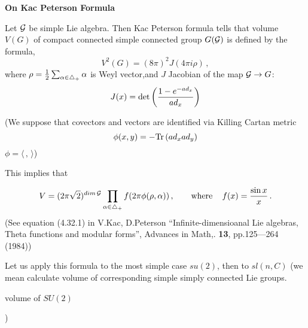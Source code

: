 \baselineskip-14pt

\def\e{{\bf e}}
\def\f{{\bf f}}
\def\y{{\bf y}}
\def\p{\partial}
\def\a{\alpha}
\def\t{\tilde}
\def\G {{\cal G}}
\def\C {{\bf C}}
\def\vare{\varepsilon}
\def\t {{\bf t}}
\def\Tr {{\rm Tr\,}}


   \centerline {\bf On Kac Peterson Formula}
   Let $\G$ be simple Lie algebra. Then
Kac Peterson formula tells that
        volume $V(G)$ of compact connected simple connected group  
$G(\G)$ is defined by the formula,
      $$
V^2(G)=(8\pi)^2J(4\pi i\rho)\,,
       $$
where $\rho={1\over 2}\sum_{\a\in\triangle_+}\a$
is Weyl vector,and $J$ Jacobian of the map $\G\to G$:
      $$
J(x)=\det\left(1-e^{-ad_x}\over ad_x\right)
      $$

(We suppose that covectors and vectors are identified
via  Killing Cartan metric
       $$
 \phi(x,y)=-{\rm Tr}\left(ad_x ad_y\right)
       $$ 
$\phi=\langle\,,\,\rangle$)

 This implies that

          $$
V=(2\pi\sqrt 2)^{{ dim\,}\G}
\prod_{\a\in\triangle_+}
f(2\pi\phi(\rho,\a))
\,,\qquad {\rm where}\,\quad f(x)={\sin x\over x}\,. 
          $$
(See equation (4.32.1) in
 V.Kac, D.Peterson ``Infinite-dimensioanal Lie algebras, Theta functions
and modular forms'', Advances in Math,. {\bf 13}, pp.125---264 (1984))


Let us apply this formula to the most simple case $su(2)$,
then to $sl(n,C)$ (we mean calculate volume of corresponding simple
simply connected Lie groups.


     \centerline {volume of $SU(2)$})

